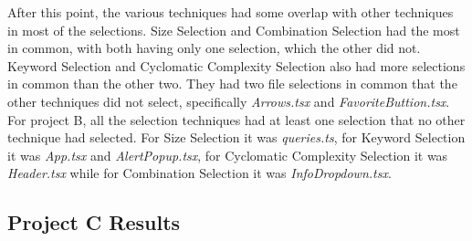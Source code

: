 After this point, the various techniques had some overlap with other techniques in most of the selections. Size Selection and Combination Selection had the most in common, with both having only one selection, which the other did not. Keyword Selection and Cyclomatic Complexity Selection also had more selections in common than the other two. They had two file selections in common that the other techniques did not select, specifically \textit{Arrows.tsx} and \textit{FavoriteButtion.tsx}. \\

For project B, all the selection techniques had at least one selection that no other technique had selected. For Size Selection it was \textit{queries.ts}, for Keyword Selection it was \textit{App.tsx} and \textit{AlertPopup.tsx}, for Cyclomatic Complexity Selection it was \textit{Header.tsx} while for Combination Selection it was \textit{InfoDropdown.tsx}. \\




\subsection{Project C Results} 

